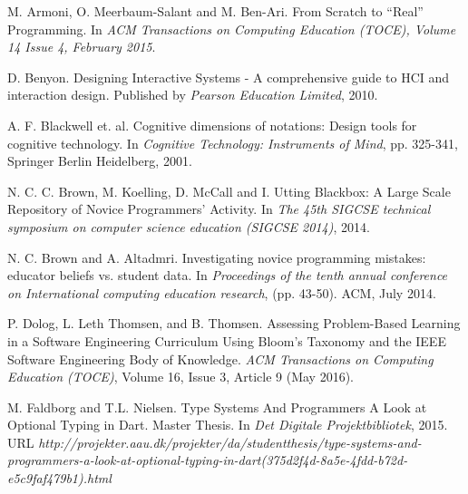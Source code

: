 \documentclass[preprint,10pt]{sigplanconf}
\begin{document}
\begin{thebibliography}{}
\softraggedright

M. Armoni, O. Meerbaum-Salant and M. Ben-Ari. \newblock From Scratch to “Real” Programming. \newblock In \emph{ACM Transactions on Computing Education (TOCE), Volume 14 Issue 4, February 2015}.

D. Benyon. \newblock Designing Interactive Systems - A comprehensive guide to HCI and interaction design. \newblock Published by \emph{Pearson Education Limited}, 2010.

A. F. Blackwell et. al. \newblock Cognitive dimensions of notations: Design tools for cognitive technology. \newblock In \emph{Cognitive Technology: Instruments of Mind}, pp. 325-341, Springer Berlin Heidelberg, 2001.

N. C. C. Brown, M. Koelling, D. McCall and I. Utting \newblock Blackbox: A Large Scale Repository of Novice Programmers’ Activity. \newblock In \emph{The 45th SIGCSE technical symposium on computer science education (SIGCSE 2014)}, 2014.

N. C. Brown and A. Altadmri. \newblock Investigating novice programming mistakes: educator beliefs vs. student data. \newblock In \emph{Proceedings of the tenth annual conference on International computing education research}, (pp. 43-50). ACM, July 2014.

P. Dolog, L. Leth Thomsen, and B. Thomsen. \newblock Assessing Problem-Based Learning in a Software Engineering Curriculum Using Bloom’s Taxonomy and the IEEE Software Engineering Body of Knowledge. \newblock \emph{ACM Transactions on Computing Education (TOCE)}, Volume 16, Issue 3, Article 9 (May 2016).

M. Faldborg and T.L. Nielsen. \newblock Type Systems And Programmers \: A Look at Optional Typing in Dart. \newblock Master Thesis. In \emph{Det Digitale Projektbibliotek}, 2015.
\newblock URL \emph{http://projekter.aau.dk/projekter/da/studentthesis/type-systems-and-programmers-a-look-at-optional-typing-in-dart(375d2f4d-8a5e-4fdd-b72d-e5c9faf479b1).html}


\end{thebibliography}
\end{document}
